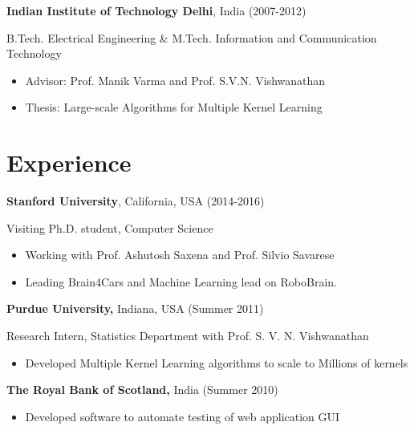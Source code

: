 \documentclass[line,margin]{res}
\begin{document}
\begin{resume}
 {\bf Indian Institute of Technology Delhi}, India  \hfill (2007-2012)
   
 \vspace{-4mm}
  \hspace {4mm } B.Tech. Electrical Engineering \& M.Tech. Information
and Communication Technology
 \begin{itemize} \itemsep -2pt  %
 \item Advisor: Prof. Manik Varma and Prof. S.V.N. Vishwanathan
 \item Thesis: Large-scale Algorithms for Multiple Kernel Learning
 \end{itemize}

\section{Experience}

{\bf Stanford University}, California, USA  \hfill (2014-2016)
 
 \vspace{-4mm}
  \hspace {4mm } Visiting Ph.D. student, Computer Science 
 \begin{itemize} \itemsep -2pt  %
 \item Working with Prof. Ashutosh Saxena and Prof. Silvio Savarese
 \item Leading Brain4Cars and Machine Learning lead on RoboBrain.
 \end{itemize}

{\bf Purdue University,} Indiana, USA \hfill (Summer 2011)
    
 \vspace{-3mm}
  \hspace {4mm }Research Intern, Statistics Department with Prof. S. V. N. Vishwanathan
 \begin{itemize} \itemsep -2pt  %
 \item Developed Multiple Kernel Learning algorithms to scale to Millions of
kernels
 \end{itemize}

{\bf The Royal Bank of Scotland,} India  \hfill  (Summer 2010)
   

\begin{itemize} \itemsep -2pt 
\item Developed software to automate testing of web application GUI
\end{itemize}



\end{resume}
\end{document}

